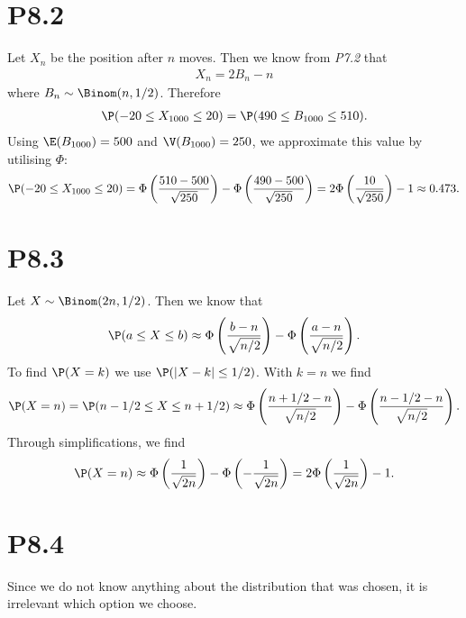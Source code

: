 \documentclass{article}
\begin{document}
\section*{P8.2}

Let $X_n$ be the position after $n$ moves. Then we know from \emph{P7.2}
that
\begin{align*}
  X_n = 2B_n-n
\end{align*}
where $B_n\sim\Binom(n,1/2)$. Therefore
\begin{align*}
  \P(-20\leq X_{1000} \leq 20) = \P(490 \leq B_{1000} \leq 510).
\end{align*}
Using $\E(B_{1000})=500$ and $\V(B_{1000})=250$, we approximate this value
by utilising $\Phi$:
\begin{align*}
  \P(-20\leq X_{1000} \leq 20) = \Phi\left(\frac{510-500}{\sqrt{250}}\right)
  - \Phi\left(\frac{490-500}{\sqrt{250}}\right)
  = 2\Phi\left(\frac{10}{\sqrt{250}}\right)-1\approx 0.473.
\end{align*}

\section*{P8.3}

Let $X\sim\Binom(2n,1/2)$. Then we know that
\begin{align*}
  \P(a \leq X \leq b) \approx \Phi\left(\frac{b-n}{\sqrt{n/2}}\right)-\Phi\left(\frac{a-n}{\sqrt{n/2}}\right).
\end{align*}
To find $\P(X=k)$ we use $\P(|X-k|\leq 1/2)$. With $k=n$ we find
\begin{align*}
  \P(X=n) = \P(n-1/2\leq X \leq n+1/2) \approx \Phi\left(\frac{n+1/2-n}{\sqrt{n/2}}\right)-\Phi\left(\frac{n-1/2-n}{\sqrt{n/2}}\right).
\end{align*}
Through simplifications, we find
\begin{align*}
  \P(X=n) \approx \Phi\left(\frac{1}{\sqrt{2n}}\right)-\Phi\left(-\frac{1}{\sqrt{2n}}\right)
  =2\Phi\left(\frac{1}{\sqrt{2n}}\right)-1. 
\end{align*}

\section*{P8.4}

Since we do not know anything about the distribution that was chosen,
it is irrelevant which option we choose.
\end{document}
